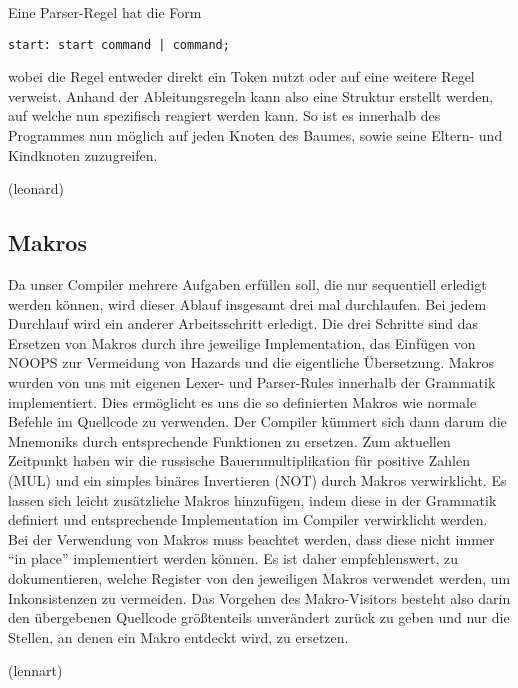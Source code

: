 \documentclass[paper=a4,fontsize=12pt,twocolumn]{scrreprt}
\begin{document}
Eine Parser-Regel hat die Form
\begin{lstlisting}
start: start command | command;
\end{lstlisting}
wobei die Regel entweder direkt ein Token nutzt oder auf eine weitere Regel verweist.
Anhand der Ableitungsregeln kann also eine Struktur erstellt werden, auf welche nun spezifisch reagiert werden kann.
So ist es innerhalb des Programmes nun möglich auf jeden Knoten des Baumes, sowie seine Eltern- und Kindknoten zuzugreifen.

(leonard)

\subsection{Makros}
Da unser Compiler mehrere Aufgaben erfüllen soll, die nur sequentiell erledigt werden können, wird dieser Ablauf insgesamt drei mal durchlaufen.
Bei jedem Durchlauf wird ein anderer Arbeitsschritt erledigt.
Die drei Schritte sind das Ersetzen von Makros durch ihre jeweilige Implementation, das Einfügen von NOOPS zur Vermeidung von Hazards und die eigentliche Übersetzung.
Makros wurden von uns mit eigenen Lexer- und Parser-Rules innerhalb der Grammatik implementiert.
Dies ermöglicht es uns die so definierten Makros wie normale Befehle im Quellcode zu verwenden.
Der Compiler kümmert sich dann darum die Mnemoniks durch entsprechende Funktionen zu ersetzen.
Zum aktuellen Zeitpunkt haben wir die russische Bauernmultiplikation für positive Zahlen (MUL) und ein simples binäres Invertieren (NOT) durch Makros verwirklicht.
Es lassen sich leicht zusätzliche Makros hinzufügen, indem diese in der Grammatik definiert  und entsprechende Implementation im Compiler verwirklicht werden.
Bei der Verwendung von Makros muss beachtet werden, dass diese nicht immer \enquote{in place} implementiert werden können.
Es ist daher empfehlenswert, zu dokumentieren, welche Register von den jeweiligen Makros verwendet werden, um Inkonsistenzen zu vermeiden.
Das Vorgehen des Makro-Visitors besteht also darin den übergebenen Quellcode größtenteils unverändert zurück zu geben und nur die Stellen, an denen ein Makro entdeckt wird, zu ersetzen.

(lennart)
\end{document}
